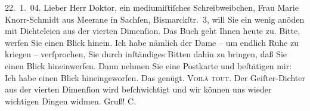 \pstart
           \raggedleft{}22. 1. 04.\pend
           \vspace{0.5em}
\pstart
           Lieber Herr Doktor, ein mediumiſtiſches Schreibweibchen, Frau Marie Knorr-Schmidt aus Meerane in Sachſen, Bismarckſtr. 3, will Sie ein wenig anöden mit
               Dichteleien aus der vierten Dimenſion. Das Buch geht Ihnen heute zu. Bitte, werfen Sie einen Blick
               hinein. Ich habe nämlich der Dame – um endlich Ruhe zu kriegen – verſprochen, Sie
               durch inſtändiges Bitten dahin zu bringen, daß Sie einen Blick hineinwerfen. Dann
               nehmen Sie eine Postkarte und beſtätigen mir: Ich habe einen Blick hineingeworfen.
               Das genügt. \textsc{Voilà tout}. Der Geiſter-Dichter aus der vierten
               Dimenſion wird beſchwichtigt und wir können uns wieder wichtigen Dingen widmen. Gruß!
                  \spacefill\mbox{C.}\pend
           \endnumbering{}  \newcommand{\dateiname}{L01362}\newcommand{\titel}{Michael Georg Conrad an Arthur Schnitzler, 22. 1. 1904}\newcommand{\editorInnen}{Martin Anton Müller und Gerd-Hermann Susen}
